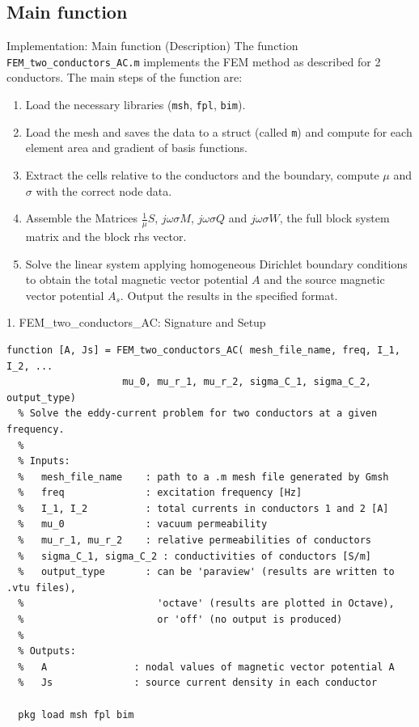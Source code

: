 \documentclass[aspectratio=54,xcolor=dvipsnames]{beamer}
\begin{document}
\subsection{Main function}
\begin{frame}{Implementation: Main function (Description)}
    The function \texttt{FEM\_two\_conductors\_AC.m} implements the FEM method as described for 2 conductors. The main steps of the function are:
    \begin{enumerate}
        \item Load the necessary libraries (\texttt{msh}, \texttt{fpl}, \texttt{bim}).
        \item Load the mesh and saves the data to a struct (called \texttt{m}) and compute for each element area and gradient of basis functions.
        \item Extract the cells relative to the conductors and the boundary, compute $\mu$ and $\sigma$ with the correct node data.
        \item Assemble the Matrices $\frac{1}{\mu}S$, $j \omega \sigma M$, $j \omega \sigma Q$ and $j \omega \sigma W$, the full block system matrix and the block rhs vector.
        \item Solve the linear system applying homogeneous Dirichlet boundary conditions to obtain the total magnetic vector potential $A$ and the source magnetic vector potential $A_s$. Output the results in the specified format.
    \end{enumerate} 
\end{frame}

\begin{frame}[fragile]{1. FEM\_two\_conductors\_AC: Signature and Setup}
\small
\begin{lstlisting}
function [A, Js] = FEM_two_conductors_AC( mesh_file_name, freq, I_1, I_2, ...
                    mu_0, mu_r_1, mu_r_2, sigma_C_1, sigma_C_2, output_type)
  % Solve the eddy-current problem for two conductors at a given frequency.
  %
  % Inputs:
  %   mesh_file_name    : path to a .m mesh file generated by Gmsh
  %   freq              : excitation frequency [Hz]
  %   I_1, I_2          : total currents in conductors 1 and 2 [A]
  %   mu_0              : vacuum permeability
  %   mu_r_1, mu_r_2    : relative permeabilities of conductors
  %   sigma_C_1, sigma_C_2 : conductivities of conductors [S/m]
  %   output_type       : can be 'paraview' (results are written to .vtu files),
  %                       'octave' (results are plotted in Octave),
  %                       or 'off' (no output is produced)
  %
  % Outputs:
  %   A               : nodal values of magnetic vector potential A 
  %   Js              : source current density in each conductor

  pkg load msh fpl bim

\end{lstlisting}
\end{frame}
\end{document}

